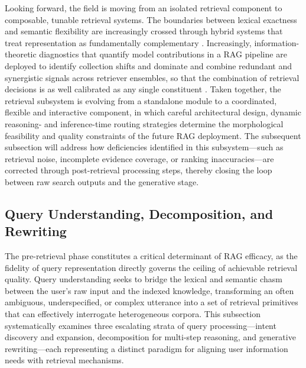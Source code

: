 \documentclass[11pt,a4paper]{article}
\begin{document}
Looking forward, the field is moving from an isolated retrieval component to composable, tunable retrieval systems. The boundaries between lexical exactness and semantic flexibility are increasingly crossed through hybrid systems that treat representation as fundamentally complementary \cite{arxiv:2510.12323v1}. Increasingly, information-theoretic diagnostics that quantify model contributions in a RAG pipeline are deployed to identify collection shifts and dominate and combine redundant and synergistic signals across retriever ensembles, so that the combination of retrieval decisions is as well calibrated as any single constituent \cite{arxiv:2602.21553v1}. Taken together, the retrieval subsystem is evolving from a standalone module to a coordinated, flexible and interactive component, in which careful architectural design, dynamic reasoning- and inference-time routing strategies determine the morphological feasibility and quality constraints of the future RAG deployment. The subsequent subsection will address how deficiencies identified in this subsystem---such as retrieval noise, incomplete evidence coverage, or ranking inaccuracies---are corrected through post-retrieval processing steps, thereby closing the loop between raw search outputs and the generative stage.


\subsection{Query Understanding, Decomposition, and Rewriting}


The pre-retrieval phase constitutes a critical determinant of RAG efficacy, as the fidelity of query representation directly governs the ceiling of achievable retrieval quality. Query understanding seeks to bridge the lexical and semantic chasm between the user's raw input and the indexed knowledge, transforming an often ambiguous, underspecified, or complex utterance into a set of retrieval primitives that can effectively interrogate heterogeneous corpora. This subsection systematically examines three escalating strata of query processing---intent discovery and expansion, decomposition for multi-step reasoning, and generative rewriting---each representing a distinct paradigm for aligning user information needs with retrieval mechanisms.
\end{document}
